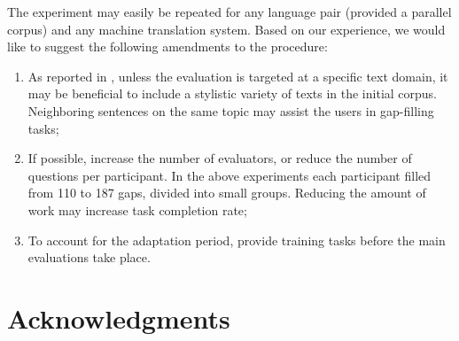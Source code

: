 \documentclass[11pt]{article}
\newcommand{\comment}[1]{}
\begin{document}
The experiment may easily be repeated for any language pair (provided a parallel corpus) and
any machine translation system. Based on our experience, we would like to suggest the following amendments to the procedure:
\begin{enumerate}
\item As reported in \cite{oregan13}, unless the evaluation is targeted at a specific text domain, it may be beneficial to include a stylistic variety of texts in the initial corpus. Neighboring sentences on the same topic may assist the users in gap-filling tasks;
\item If possible, increase the number of evaluators, or reduce the number of questions per participant. In the above experiments each participant filled from 110 to 187 gaps, divided into small groups. Reducing the amount of work may increase task completion rate;\comment{MLF's crazy idea: recaptchas?}\comment{EA: the participants did not leave the gaps empty, they just did not attempt the next portions of evaluation after finishing some and getting bored. or did I misunderstand the use of captchas? }
\item To account for the adaptation period, provide training tasks before the main evaluations take place.
\end{enumerate}

\section*{Acknowledgments}




\comment{EA: urls do not show up in web citations, how can I fix that?}

\end{document}
